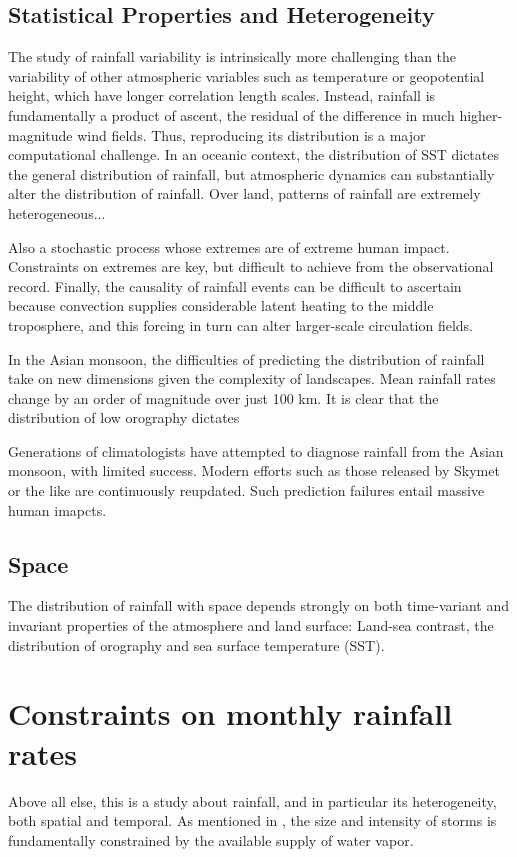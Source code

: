 \subsection{Statistical Properties and Heterogeneity}

The study of rainfall variability is intrinsically more challenging than the variability of other atmospheric variables such as temperature or geopotential height, which have longer correlation length scales. Instead, rainfall is fundamentally a product of ascent, the residual of the difference in much higher-magnitude wind fields. Thus, reproducing its distribution is a major computational challenge. In an oceanic context, the distribution of SST dictates the general distribution of rainfall, but atmospheric dynamics can substantially alter the distribution of rainfall. Over land, patterns of rainfall are extremely heterogeneous...

Also a stochastic process whose extremes are of extreme human impact. Constraints on extremes are key, but difficult to achieve from the observational record. Finally, the causality of rainfall events can be difficult to ascertain because convection supplies considerable latent heating to the middle troposphere, and this forcing in turn can alter larger-scale circulation fields.

In the Asian monsoon, the difficulties of predicting the distribution of rainfall take on new dimensions given the complexity of landscapes. Mean rainfall rates change by an order of magnitude over just 100 km. It is clear that the distribution of low orography dictates 

Generations of climatologists have attempted to diagnose rainfall from the Asian monsoon, with limited success. Modern efforts such as those released by Skymet or the like are continuously reupdated. Such prediction failures entail massive human imapcts.


\subsection{Space}
The distribution of rainfall with space depends strongly on both time-variant and invariant properties of the atmosphere and land surface: Land-sea contrast, the distribution of orography and sea surface temperature (SST).

\section{Constraints on monthly rainfall rates}
Above all else, this is a study about rainfall, and in particular its heterogeneity, both spatial and temporal. As mentioned in \cite{Trenberth}, the size and intensity of storms is fundamentally constrained by the available supply of water vapor.

